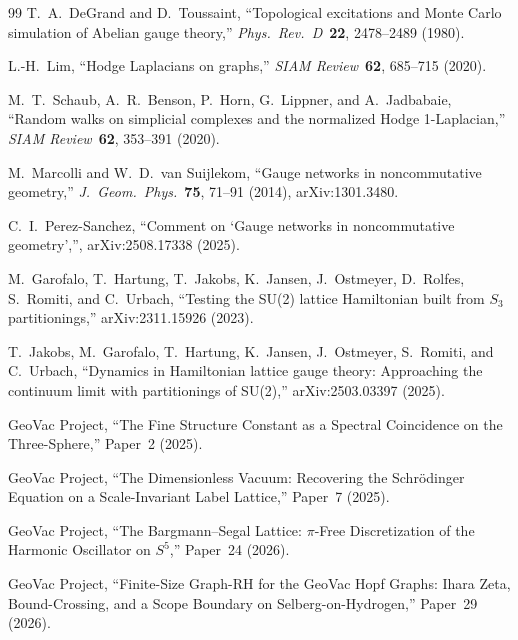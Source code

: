 \documentclass[11pt]{article}
\begin{document}
\begin{thebibliography}{99}
T.~A.~DeGrand and D.~Toussaint, ``Topological excitations and Monte Carlo
simulation of Abelian gauge theory,''
\textit{Phys.~Rev.~D}\ \textbf{22}, 2478--2489 (1980).

L.-H.~Lim, ``Hodge Laplacians on graphs,''
\textit{SIAM Review}\ \textbf{62}, 685--715 (2020).

M.~T.~Schaub, A.~R.~Benson, P.~Horn, G.~Lippner, and A.~Jadbabaie,
``Random walks on simplicial complexes and the normalized Hodge 1-Laplacian,''
\textit{SIAM Review}\ \textbf{62}, 353--391 (2020).

M.~Marcolli and W.~D.~van Suijlekom,
``Gauge networks in noncommutative geometry,''
\textit{J.~Geom.~Phys.}\ \textbf{75}, 71--91 (2014),
arXiv:1301.3480.

C.~I.~Perez-Sanchez,
``Comment on `Gauge networks in noncommutative geometry','',
arXiv:2508.17338 (2025).

M.~Garofalo, T.~Hartung, T.~Jakobs, K.~Jansen, J.~Ostmeyer, D.~Rolfes,
S.~Romiti, and C.~Urbach,
``Testing the SU(2) lattice Hamiltonian built from $S_3$ partitionings,''
arXiv:2311.15926 (2023).

T.~Jakobs, M.~Garofalo, T.~Hartung, K.~Jansen, J.~Ostmeyer, S.~Romiti,
and C.~Urbach,
``Dynamics in Hamiltonian lattice gauge theory: Approaching the
continuum limit with partitionings of SU(2),''
arXiv:2503.03397 (2025).

GeoVac Project, ``The Fine Structure Constant as a Spectral Coincidence
on the Three-Sphere,'' Paper~2 (2025).

GeoVac Project, ``The Dimensionless Vacuum: Recovering the Schr\"odinger
Equation on a Scale-Invariant Label Lattice,'' Paper~7 (2025).

GeoVac Project, ``The Bargmann--Segal Lattice: $\pi$-Free
Discretization of the Harmonic Oscillator on $S^5$,'' Paper~24
(2026).

GeoVac Project, ``Finite-Size Graph-RH for the GeoVac Hopf Graphs: Ihara Zeta, Bound-Crossing, and a Scope Boundary on Selberg-on-Hydrogen,'' Paper~29
(2026).

\end{thebibliography}
\end{document}
